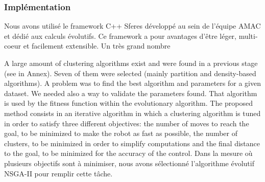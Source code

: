 \documentclass{llncs}
\newcommand*\circled[1]{\tikz[baseline=(char.base)]{
            \node[shape=circle,draw,inner sep=2pt] (char) {#1};}}
\begin{document}
%

\subsubsection{Implémentation}
Nous avons utilisé le framework C++ Sferes \cite{Mouret2010} développé au sein de l'équipe AMAC et dédié aux calculs évolutifs. Ce framework a pour avantages d'être léger, multi-coeur et facilement extensible. Un très grand nombre

A large amount of clustering algorithms exist and were found in a previous stage (see in Annex). Seven of them were selected (mainly partition and density-based algorithms). A problem was to find the best algorithm and parameters for a given dataset. We needed also a way to validate the parameters found.
That algorithm is used by the fitness function within the evolutionary algorithm. The proposed method consists in an iterative algorithm in which a clustering algorithm is tuned in order to satisfy three different objectives: \circled{1} the number of moves to reach the goal, to be minimized to make the robot as fast as possible, \circled{2} the number of clusters, to be minimized in order to simplify computations and \circled{3} the final distance to the goal, to be minimized for the accuracy of the control.
Dans la mesure où plusieurs objectifs sont à minimiser, nous avons sélectionné l'algorithme évolutif NSGA-II\cite{Deb:2002:FEM:2221359.2221582} pour remplir cette tâche.
\end{document}

